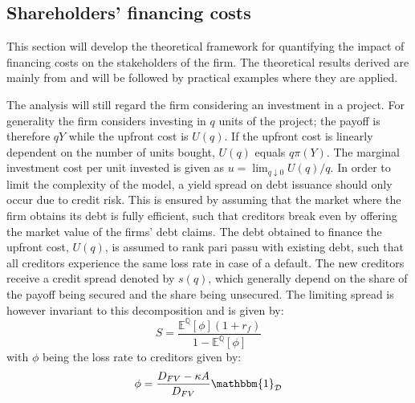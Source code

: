 \documentclass[../main.tex]{subfiles}
\begin{document}
    \newcommand{\discountfactor}{\frac{1}{1 + r_{f}}}
    \subsection{Shareholders' financing costs}
        This section will develop the theoretical framework for quantifying the impact of financing costs on the stakeholders of the firm.
        The theoretical results derived are mainly from \cite{ADS2019} and will be followed by practical examples where they are applied.


        The analysis will still regard the firm considering an investment in a project.
        For generality the firm considers investing in $q$ units of the project; 
        the payoff is therefore $qY$ while the upfront cost is $U(q)$. 
        If the upfront cost is linearly dependent on the number of units bought, $U(q)$ equals $q\pi(Y)$. 
        The marginal investment cost per unit invested is given as 
        $u = \lim_{q\downarrow 0} U(q) / q$.
        In order to limit the complexity of the model, a yield spread on debt issuance should only occur due to credit risk. 
        This is ensured by assuming that the market where the firm obtains its debt is fully efficient, 
        such that creditors break even by offering the market value of the firms' debt claims.
        The debt obtained to finance the upfront cost, $U(q)$, is assumed to rank pari passu with existing debt, 
        such that all creditors experience the same loss rate in case of a default.
        The new creditors receive a credit spread denoted by $s(q)$,
        which generally depend on the share of the payoff being secured and the share being unsecured.
        The limiting spread is however invariant to this decomposition and is given by:
            \begin{equation}
                S = \frac{
                    \mathbb{E}^{\mathbb{Q}}\left[\phi\right] 
                    (1 + r_{f})
                }{
                    1 - \mathbb{E}^{\mathbb{Q}}\left[\phi\right]
                }
            \end{equation}
        with $\phi$ being the loss rate to creditors given by:
            \begin{equation}
                \phi = \frac{
                        D_{FV} - \kappa A
                    }{
                        D_{FV}
                    } 
                \mathbbm{1}_{\mathcal{D}}
            \end{equation}
\end{document}
